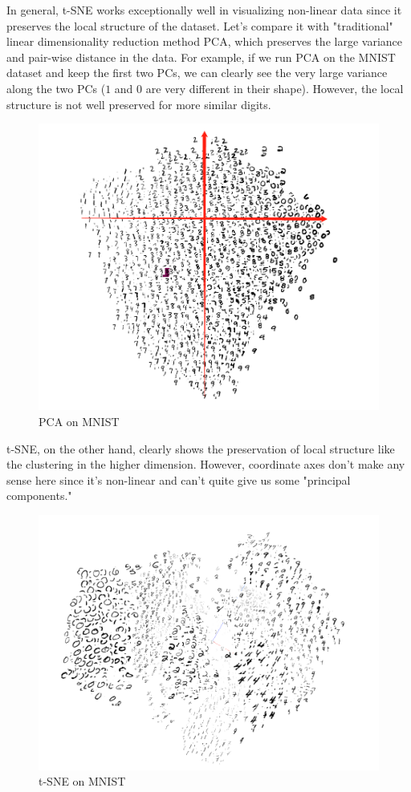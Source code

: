 \documentclass[letter,10pt]{article}
\begin{document}
\pagebreak
In general, t-SNE works exceptionally well in visualizing non-linear data since it preserves the local structure of the dataset. Let's compare it with "traditional" linear dimensionality reduction method PCA, which preserves the large variance and pair-wise distance in the data. For example, if we run PCA on the MNIST dataset and keep the first two PCs, we can clearly see the very large variance along the two PCs ($1$ and $0$ are very different in their shape). However, the local structure is not well preserved for more similar digits.

\begin{figure}[H]
    \centering
    \includegraphics[scale=0.5]{mnist_pca.png}
    \caption{PCA on MNIST}
    \label{fig:pca_mnist}
\end{figure}

\pagebreak
t-SNE, on the other hand, clearly shows the preservation of local structure like the clustering in the higher dimension. However, coordinate axes don't make any sense here since it's non-linear and can't quite give us some "principal components."

\begin{figure}[H]
    \centering
    \includegraphics[scale=0.5]{mnist_tsne.png}
    \caption{t-SNE on MNIST}
    \label{fig:tsne_mnist}
\end{figure}
\end{document}
